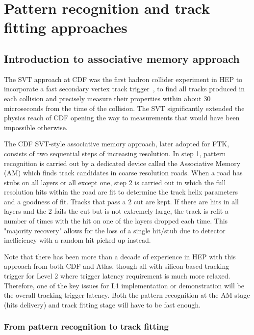 \section{Pattern recognition and track fitting approaches}

\subsection{Introduction to associative memory approach}

\noindent The SVT approach at CDF was the first hadron collider experiment in HEP to incorporate a fast secondary vertex track trigger~\cite{bib:Ade-06}, \cite{bib:Ade-07} to find all tracks produced in each collision and precisely measure their properties within about 30 microseconds from the time of the collision. The SVT significantly extended the physics reach of CDF opening the way to measurements that would have been impossible otherwise.

\noindent The CDF SVT-style associative memory approach, later adopted for FTK, consists of two sequential steps of increasing resolution.  In step 1, pattern recognition is carried out by a dedicated device called the Associative Memory (AM) which finds track candidates in coarse resolution roads.  When a road has stubs on all layers or all except one, step 2 is carried out in which the full resolution hits within the road are fit to determine the track helix parameters and a goodness of fit.  Tracks that pass a  2 cut are kept.  If there are hits in all layers and the  2 fails the cut but is not extremely large, the track is refit a number of times with the hit on one of the layers dropped each time.  This "majority recovery" allows for the loss of a single hit/stub due to detector inefficiency with a random hit picked up instead. 

\noindent Note that there has been more than a decade of experience in HEP with this approach from both CDF and Atlas, though all with silicon-based tracking trigger for Level 2 where trigger latency requirement is much more relaxed.  Therefore, one of the key issues for L1 implementation or demonstration will be the overall tracking trigger latency. Both the pattern recognition at the AM stage (hits delivery) and track fitting stage will have to be fast enough.


\subsubsection{From pattern recognition to track fitting}

